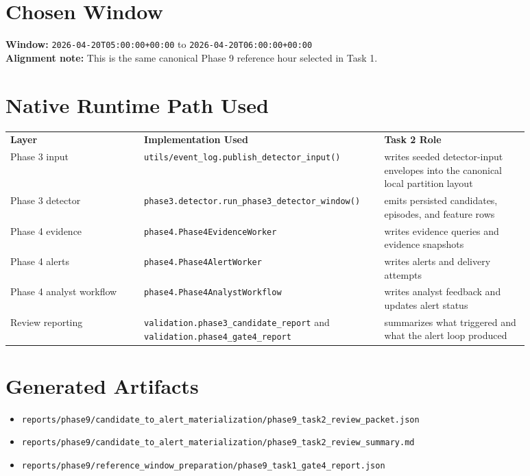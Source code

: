 \documentclass{article}
\begin{document}
\section*{Chosen Window}
\textbf{Window:} \texttt{2026-04-20T05:00:00+00:00} to \texttt{2026-04-20T06:00:00+00:00}\\
\textbf{Alignment note:} This is the same canonical Phase 9 reference hour selected in Task 1.

\section*{Native Runtime Path Used}
\begin{longtable}{p{0.24\linewidth}p{0.38\linewidth}p{0.26\linewidth}}
\textbf{Layer} & \textbf{Implementation Used} & \textbf{Task 2 Role} \\
Phase 3 input & \texttt{utils/event\_log.publish\_detector\_input()} & writes seeded detector-input envelopes into the canonical local partition layout \\
Phase 3 detector & \texttt{phase3.detector.run\_phase3\_detector\_window()} & emits persisted candidates, episodes, and feature rows \\
Phase 4 evidence & \texttt{phase4.Phase4EvidenceWorker} & writes evidence queries and evidence snapshots \\
Phase 4 alerts & \texttt{phase4.Phase4AlertWorker} & writes alerts and delivery attempts \\
Phase 4 analyst workflow & \texttt{phase4.Phase4AnalystWorkflow} & writes analyst feedback and updates alert status \\
Review reporting & \texttt{validation.phase3\_candidate\_report} and \texttt{validation.phase4\_gate4\_report} & summarizes what triggered and what the alert loop produced \\
\end{longtable}

\section*{Generated Artifacts}
\begin{itemize}
\item \texttt{reports/phase9/candidate\_to\_alert\_materialization/phase9\_task2\_review\_packet.json}
\item \texttt{reports/phase9/candidate\_to\_alert\_materialization/phase9\_task2\_review\_summary.md}
\item \texttt{reports/phase9/reference\_window\_preparation/phase9\_task1\_gate4\_report.json}
\end{itemize}
\end{document}
